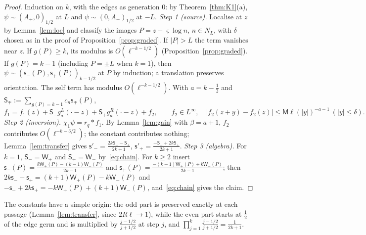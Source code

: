 \documentclass[11pt]{amsart}
\theoremstyle{definition}
\theoremstyle{remark}
\numberwithin{equation}{section}
\begin{document}
\begin{proof}
Induction on $k$, with the edges as generation $0$: by Theorem~\ref{thm:K1}(a), $\psi\sim(A_+,0)_{1/2}$ at $L$ and $\psi\sim(0,A_-)_{1/2}$ at $-L$.
\emph{Step 1 (source).} Localise at $z$ by Lemma~\ref{lem:loc} and classify the images $P=z+\varsigma\log n$, $n\in N_L$, with $\delta$ chosen as in the proof of Proposition~\ref{prop:graded}. If $|P|>L$ the term vanishes near $z$. If $g(P)\ge k$, its modulus is $O(\ell^{-k-1/2})$ (Proposition~\ref{prop:graded}). If $g(P)=k-1$ (including $P=\pm L$ when $k=1$), then $\psi\sim(\mathsf s_-(P),\mathsf s_+(P))_{k-1/2}$ at $P$ by induction; a translation preserves orientation. The self term has modulus $O(\ell^{-k-1/2})$. With $a=k-\frac12$ and $\mathsf S_\mp:=\sum_{g(P)=k-1}c_n\mathsf s_\mp(P)$,
\[
f_1=f_1(z)+\mathsf S_-g^L_a(\cdot-z)+\mathsf S_+g^R_a(\cdot-z)+f_2,\qquad f_2\in L^\infty,\quad|f_2(z+y)-f_2(z)|\le \mathsf M\ell(|y|)^{-a-1}\ (|y|\le\delta).
\]
\emph{Step 2 (inversion).} $\chi_1\psi=r_q*f_1$. By Lemma~\ref{lem:gain} with $\beta=a+1$, $f_2$ contributes $O(\ell^{-k-3/2})$; the constant contributes nothing; Lemma~\ref{lem:transfer} gives $\mathsf s'_-=\frac{2k\mathsf S_--\mathsf S_+}{2k+1}$, $\mathsf s'_+=\frac{-\mathsf S_-+2k\mathsf S_+}{2k+1}$.
\emph{Step 3 (algebra).} For $k=1$, $\mathsf S_-=\mathsf W_+$ and $\mathsf S_+=\mathsf W_-$ by~\eqref{eq:chain}. For $k\ge2$ insert $\mathsf s_-(P)=\frac{k\mathsf W_+(P)-(k-1)\mathsf W_-(P)}{2k-1}$ and $\mathsf s_+(P)=\frac{-(k-1)\mathsf W_+(P)+k\mathsf W_-(P)}{2k-1}$; then $2k\mathsf s_--\mathsf s_+=(k+1)\mathsf W_+(P)-k\mathsf W_-(P)$ and $-\mathsf s_-+2k\mathsf s_+=-k\mathsf W_+(P)+(k+1)\mathsf W_-(P)$, and~\eqref{eq:chain} gives the claim.
\end{proof}

The constants have a simple origin: the odd part is preserved exactly at each passage (Lemma~\ref{lem:transfer}, since $2R\ell\to1$), while the even part starts at $\frac12$ of the edge germ and is multiplied by $\frac{j-1/2}{j+1/2}$ at step $j$, and $\prod_{j=1}^k\frac{j-1/2}{j+1/2}=\frac1{2k+1}$.
\end{document}
